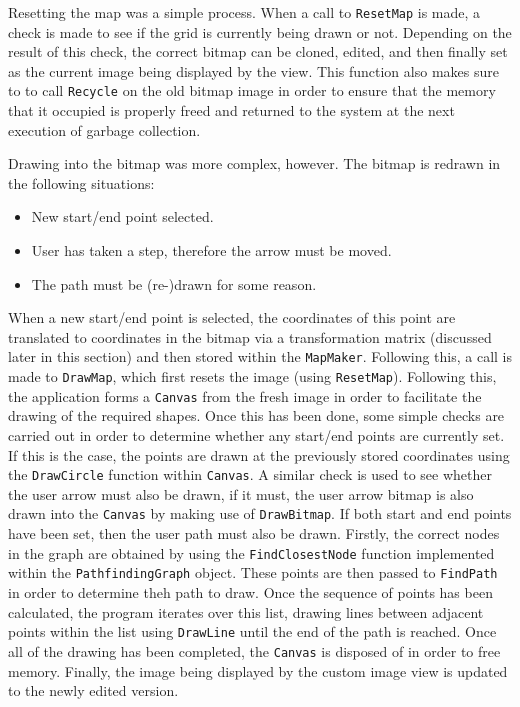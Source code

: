 \documentclass[12pt,a4paper]{report}
\begin{document}
                    Resetting the map was a simple process. When a call to \texttt{ResetMap} is made, a check is made to see if the grid is currently being drawn or not. Depending
                    on the result of this check, the correct bitmap can be cloned, edited, and then finally set as the current image being displayed by the view.
                    This function also makes sure to to call \texttt{Recycle} on the old bitmap image in order to ensure that the memory that it occupied is properly freed and
                    returned to the system at the next execution of garbage collection.
                    
                    Drawing into the bitmap was more complex, however. The bitmap is redrawn in the following situations:
                    \begin{itemize}
                        \item New start/end point selected.
                        \item User has taken a step, therefore the arrow must be moved.
                        \item The path must be (re-)drawn for some reason.
                    \end{itemize}
                    When a new start/end point is selected, the coordinates of this point are translated to coordinates in the bitmap via a transformation matrix
                    (discussed later in this section) and then stored within the \texttt{MapMaker}. Following this, a call is made to \texttt{DrawMap}, which first resets the
                    image (using \texttt{ResetMap}). Following this, the application forms a \texttt{Canvas} from the fresh image in order to facilitate the drawing of the
                    required shapes. Once this has been done, some simple checks are carried out in order to determine whether any start/end points are currently set.
                    If this is the case, the points are drawn at the previously stored coordinates using the \texttt{DrawCircle} function within \texttt{Canvas}. A similar check
                    is used to see whether the user arrow must also be drawn, if it must, the user arrow bitmap is also drawn into the \texttt{Canvas} by making use of
                    \texttt{DrawBitmap}. If both start and end points have been set, then the user path must also be drawn. Firstly, the correct nodes in the graph are obtained
                    by using the \texttt{FindClosestNode} function implemented within the \texttt{PathfindingGraph} object. These points are then passed to
                    \texttt{FindPath} in order to determine theh path to draw. Once the sequence of points has been calculated, the program iterates over this list, drawing lines
                    between adjacent points within the list using \texttt{DrawLine} until the end of the path is reached. Once all of the drawing has been completed, the
                    \texttt{Canvas} is disposed of in order to free memory. Finally, the image being displayed by the custom image view is updated to the newly edited
                    version.
                    
\end{document}
